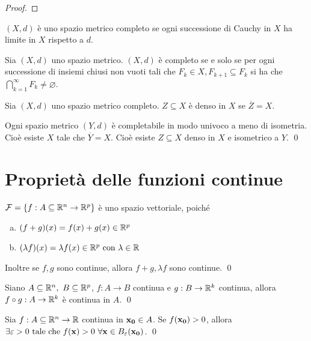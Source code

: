 \begin{proof}
\end{proof}

\begin{definition}
    $(X, d)$ è uno spazio metrico completo se ogni successione di Cauchy in $X$ ha limite in $X$ rispetto a $d$.
\end{definition}

\begin{theorem}
    Sia $(X,d)$ uno spazio metrico. $(X,d)$ è completo se e solo se per ogni successione di insiemi chiusi non vuoti tali che $F_k \in X, F_{k+1}\subseteq F_k$ si ha che $\bigcap\limits_{k=1}^{\infty}F_k\neq\varnothing$.
\end{theorem}

\begin{definition}
    Sia $(X,d)$ uno spazio metrico completo. $Z \subseteq X$ è denso in $X$ se $\overline{Z} = X$.
\end{definition}

\begin{theorem}
    Ogni spazio metrico $(Y,d)$ è completabile in modo univoco a meno di isometria. Cioè esiste $X$ tale che $\overline{Y} = X$. Cioè esiste $Z \subseteq X$ denso in $X$ e isometrico a $Y$.
    \qed
\end{theorem}

\section{Proprietà delle funzioni continue}

\begin{theorem}
    $\mathcal{F}=\{f: A \subseteq \mathbb{R}^n \to \mathbb{R}^p\}$ è uno spazio vettoriale, poiché
    \begin{enumerate}[a.]
        \item $(f+g)(x)=f(x)+g(x) \in \mathbb{R}^p$
        \item $(\lambda f)(x)= \lambda f(x) \in \mathbb{R}^p \text{ con } \lambda \in \mathbb{R}$
    \end{enumerate}
    Inoltre se $f,g$ sono continue, allora $f+g, \lambda f$ sono continue.
    \qed
\end{theorem}

\begin{theorem}
    Siano $A \subseteq \mathbb{R}^n, \ B \subseteq \mathbb{R}^p$, $f: A \to B$ continua e $g: B \to \mathbb{R}^k$ continua, allora $f\circ g: A \to \mathbb{R}^k$ è continua in $A$.
    \qed
\end{theorem}

\begin{theorem}
    \label{thm:sign}
    Sia $f: A \subseteq \mathbb{R}^n \to \mathbb{R}$ continua in $\vb{x_0}\in A$. Se $f(\vb{x_0})>0$, allora $\exists \varepsilon > 0 \tc f(\vb{x}) > 0 \ \forall \vb{x} \in B_\varepsilon(\vb{x_0})$.
    \qed
\end{theorem}